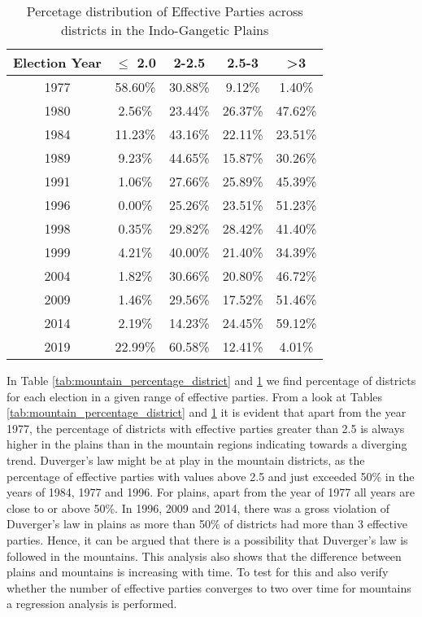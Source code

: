 \begin{table}[h]
\centering
\begin{tabular}{|c|c|c|c|c|}
\hline
Election Year & $\leq$ 2.0 & 2-2.5 & 2.5-3 & >3 \\ \hline
1977 & 58.60\% & 30.88\% & 9.12\% & 1.40\% \\ \hline
1980 & 2.56\% & 23.44\% & 26.37\% & 47.62\% \\ \hline
1984 & 11.23\% & 43.16\% & 22.11\% & 23.51\% \\ \hline
1989 & 9.23\% & 44.65\% & 15.87\% & 30.26\% \\ \hline
1991 & 1.06\% & 27.66\% & 25.89\% & 45.39\% \\ \hline
1996 & 0.00\% & 25.26\% & 23.51\% & 51.23\% \\ \hline
1998 & 0.35\% & 29.82\% & 28.42\% & 41.40\% \\ \hline
1999 & 4.21\% & 40.00\% & 21.40\% & 34.39\% \\ \hline
2004 & 1.82\% & 30.66\% & 20.80\% & 46.72\% \\ \hline
2009 & 1.46\% & 29.56\% & 17.52\% & 51.46\% \\ \hline
2014 & 2.19\% & 14.23\% & 24.45\% & 59.12\% \\ \hline
2019 & 22.99\% & 60.58\% & 12.41\% & 4.01\% \\ \hline
\end{tabular}
\caption{Percetage distribution of Effective Parties across districts in the Indo-Gangetic Plains}
\label{tab:plain_percentage_districts}

\end{table}
In Table \ref{tab:mountain_percentage_district} and \ref{tab:plain_percentage_districts} we find percentage of districts for each election in a given range of effective parties. From a look at Tables \ref{tab:mountain_percentage_district} and \ref{tab:plain_percentage_districts} it is evident that apart from the year 1977, the percentage of districts with effective parties greater than 2.5 is always higher in the plains than in the mountain regions indicating towards a diverging trend. Duverger’s law might be at play in the mountain districts, as the percentage of effective parties with values above 2.5 and just exceeded 50\% in the years of 1984, 1977 and 1996. For plains, apart from the year of 1977 all years are close to or above 50\%. In 1996, 2009 and 2014, there was a gross violation of Duverger’s law in plains as more than 50\% of districts had more than 3 effective parties. Hence, it can be argued that there is a possibility that  Duverger’s law is followed in the mountains. This analysis also shows that the difference between plains and mountains is increasing with time. To test for this and also verify whether the number of effective parties converges to two over time for mountains a regression analysis is performed.

